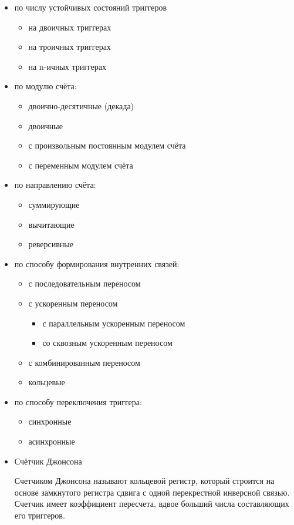 \documentclass[unicode, 12pt, a4paper, oneside]{article}
\begin{document}
\begin{itemize}
\item по числу устойчивых состояний триггеров
	\begin{itemize}
	\item на двоичных триггерах
	\item на троичных триггерах
	\item на n-ичных триггерах
	\end{itemize}
\item по модулю счёта:
	\begin{itemize}
	\item двоично-десятичные (декада)
	\item двоичные
	\item с произвольным постоянным модулем счёта
	\item с переменным модулем счёта
	\end{itemize}
\item по направлению счёта:
	\begin{itemize}
	\item суммирующие
	\item вычитающие
	\item реверсивные
	\end{itemize}
\item по способу формирования внутренних связей:
	\begin{itemize}
	\item с последовательным переносом
	\item с ускоренным переносом
		\begin{itemize}
		\item с параллельным ускоренным переносом
		\item со сквозным ускоренным переносом
		\end{itemize}
	\item с комбинированным переносом
	\item кольцевые
	\end{itemize}
\item по способу переключения триггера:
	\begin{itemize}
	\item синхронные
	\item асинхронные
	\end{itemize}
\item Счётчик Джонсона
	\par Счетчиком Джонсона называют кольцевой регистр, который строится на основе замкнутого регистра сдвига с одной перекрестной инверсной связью. Счетчик имеет коэффициент пересчета, вдвое больший числа составляющих его триггеров.
\end{itemize}
\end{document}
